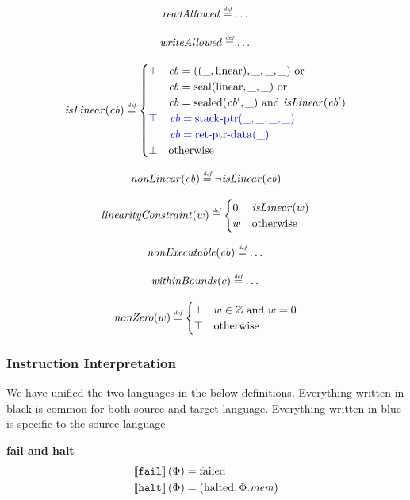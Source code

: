 \documentclass[a4paper]{article}
\newcommand{\defeq}{\stackrel{\textit{\tiny{def}}}{=}}
\newcommand{\sem}[1]{\left\llbracket #1 \right\rrbracket}
\newcommand{\tand}{\text{ and }}
\newcommand{\tor}{\text{ or }}
\newcommand{\totherwise}{\text{otherwise }}
\newcommand{\sourcecolor}{\color{blue}}
\newcommand{\src}[1]{{\sourcecolor #1}}
\newcommand{\targetcolor}[1]{\color{black}}
\newcommand{\trg}[1]{{\targetcolor{} #1}}
\newcommand{\zinstr}[1]{\texttt{#1}}
\newcommand{\tfail}{\zinstr{\trg{fail}}}
\newcommand{\thalt}{\zinstr{\trg{halt}}}
\newcommand{\ints}{\mathbb{Z}}
\newcommand{\shareddom}[1]{\mathrm{#1}}
\newcommand{\stkptr}[1]{\mathrm{stack\text{-}ptr}(#1)}
\newcommand{\retptrd}{\mathrm{ret\text{-}ptr\text{-}data}}
\newcommand{\seal}[1]{\shareddom{seal}(#1)}
\newcommand{\sealed}[1]{\shareddom{sealed}(#1)}
\newcommand{\failed}{\mathrm{failed}}
\newcommand{\halted}{\mathrm{halted}}
\newcommand{\var}[1]{\mathit{#1}}
\newcommand{\mem}{\var{mem}}
\newcommand{\cb}{\var{cb}}
\newcommand{\plainlinearity}[1]{\mathrm{#1}}
\newcommand{\linear}{\plainlinearity{linear}}
\newcommand{\plainfun}[2]{
  \ifthenelse{\equal{#2}{}}
  {\mathit{#1}}
  {\mathit{#1}(#2)}
}
\newcommand{\nonExec}[1]{\plainfun{nonExecutable}{#1}}
\newcommand{\readAllowed}[1]{\plainfun{readAllowed}{#1}}
\newcommand{\writeAllowed}[1]{\plainfun{writeAllowed}{#1}}
\newcommand{\nonLinear}[1]{\plainfun{nonLinear}{#1}}
\newcommand{\linCons}[1]{\plainfun{linearityConstraint}{#1}}
\newcommand{\isLinear}[1]{\plainfun{isLinear}{#1}}
\newcommand{\withinBounds}[1]{\plainfun{withinBounds}{#1}}
\newcommand{\nonZero}[1]{\plainfun{nonZero}{#1}}
\begin{document}
\[
  \readAllowed{} \defeq \dots
\]

\[
  \writeAllowed{} \defeq \dots
\]

\[
  \isLinear{\cb} \defeq
  \begin{cases}
    \top & 
    \arraycolsep=0pt
    \begin{array}[t]{l}
      \cb = ((\_,\linear),\_,\_,\_) \tor\\
      \cb = \seal{\linear,\_,\_} \tor\\
      \cb = \sealed{\cb',\_} \tand \isLinear{\cb'} 
    \end{array}\\
    \src{\top} & 
    \sourcecolor\left.
    \arraycolsep=0pt
    \begin{array}[t]{l}
      \cb = \stkptr{\_,\_,\_,\_}\\
      \cb = \retptrd(\_)
    \end{array}\right.\\
    \bot & \totherwise
  \end{cases}
\]

\[
  \nonLinear{\cb} \defeq \neg \isLinear{\cb}
\]

\[
  \linCons{w} \defeq
  \begin{cases}
    0 & \isLinear{w} \\
    w & \totherwise
  \end{cases}
\]

\[
  \nonExec{\cb} \defeq \dots
\]

\[
  \withinBounds{c} \defeq \dots
\]

\[
  \nonZero{w} \defeq
  \begin{cases}
    \bot & w \in \ints \tand w = 0 \\
    \top & \totherwise
  \end{cases}
\]

\subsubsection{Instruction Interpretation}
We have unified the two languages in the below definitions. Everything written in black is common for both source and target language. Everything written in \src{blue} is specific to the source language.

\noindent\textbf{fail and halt}\\
\begin{align*}
  \sem{\tfail}(\Phi) = & \; \failed \\
  \sem{\thalt}(\Phi) = & \; (\halted, \Phi.\mem)
\end{align*}
\end{document}
